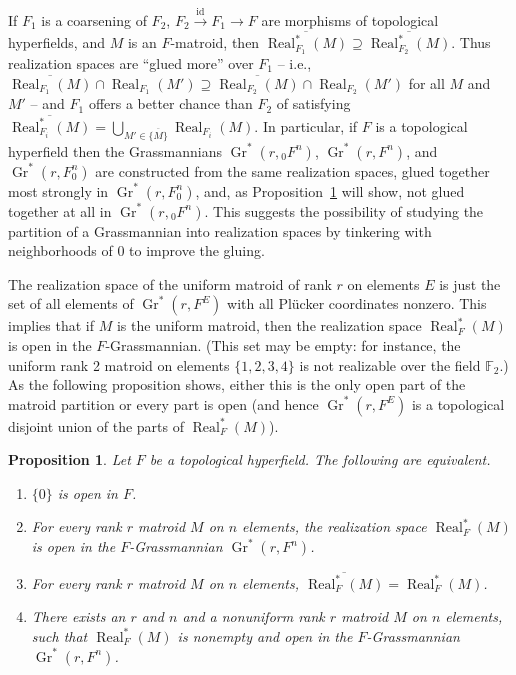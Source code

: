 \documentclass[10pt, preprint]{article}
\newtheorem{prop}[theorem]{Proposition}
\theoremstyle{definition}
\begin{document}
If $F_{1}$ is a coarsening of $F_{2}$, $F_{2}\stackrel{\mathrm{id}}{
\to }F_{1}\to F$ are morphisms of topological hyperfields, and $M$ is
an $F$-matroid, then $\overline{\operatorname{Real}^{*}_{F_{1}}(M)}
\supseteq \overline{\operatorname{Real}^{*}_{F_{2}}(M)}$. Thus
realization spaces are ``glued more'' over $F_{1}$ -- i.e., $\overline{
\operatorname{Real}_{F_{1}}(M)}\cap \operatorname{Real}_{F_{1}}(M')
\supseteq \overline{\operatorname{Real}_{F_{2}}(M)}\cap
\operatorname{Real}_{F_{2}}(M')$ for all $M$ and $M'$ -- and
$F_{1}$ offers a better chance than $F_{2}$ of satisfying $\overline{
\operatorname{Real}^{*}_{F_{i}}(M)}=\bigcup _{M'\in \overline{\{M\}}}
\operatorname{Real}_{F_{i}}(M)$. In particular, if $F$ is a topological
hyperfield then the Grassmannians $\operatorname{Gr}^{*}(r, {_{0}F}
^{n})$, $\operatorname{Gr}^{*}(r, F^{n})$, and $\operatorname{Gr}^{*}(r,
F_{0}^{n})$ are constructed from the same realization spaces, glued
together most strongly in $\operatorname{Gr}^{*}(r, F_{0}^{n})$, and,
as Proposition~\ref{prop:0open} will show, not glued together at all in
$\operatorname{Gr}^{*}(r, {_{0}F}^{n})$. This suggests the possibility
of studying the partition of a Grassmannian into realization spaces by
tinkering with neighborhoods of 0 to improve the gluing.

The realization space of the uniform matroid of rank $r$ on elements
$E$ is just the set of all elements of $\operatorname{Gr}^{*}(r, F
^{E})$ with all Pl\"{u}cker coordinates nonzero. This implies that if
$M$ is the uniform matroid, then the realization space $
\operatorname{Real}_{F}^{*}(M)$ is open in the $F$-Grassmannian. (This
set may be empty: for instance, the uniform rank 2 matroid on elements
$\{1,2,3,4\}$ is not realizable over the field $\mathbb{F}_{2}$.) As the
following proposition shows, either this is the only open part of the
matroid partition or every part is open (and hence $\operatorname{Gr}
^{*}(r, F^{E})$ is a topological disjoint union of the parts of
$\operatorname{Real}_{F}^{*}(M)$).\vspace*{-2pt}

\begin{prop}
\label{prop:0open}
Let $F$ be a topological hyperfield. The following are equivalent.\vspace*{-2pt}
%
\begin{enumerate}[\textit{(a)}]%
\item[\textit{(a)}]
$\{0\}$ is open in $F$.
%
\item[\textit{(b)}]
For every rank $r$ matroid $M$ on $n$ elements, the realization space
$\operatorname{Real}_{F}^{*}(M)$ is open in the $F$-Grassmannian
$\operatorname{Gr}^{*}(r,F^{n})$.
%
\item[\textit{(c)}]
For every rank $r$ matroid $M$ on $n$ elements, $\overline{
\operatorname{Real}_{F}^{*}(M)}=\operatorname{Real}_{F}^{*}(M)$.
%
\item[\textit{(d)}]
There exists an $r$ and $n$ and a nonuniform rank $r$ matroid $M$ on
$n$ elements, such that $\operatorname{Real}_{F}^{*}(M)$ is nonempty and
open in the $F$-Grassmannian $\operatorname{Gr}^{*}(r,F^{n})$.\vspace*{-2pt}
\end{enumerate}
%
\end{prop}
\end{document}
